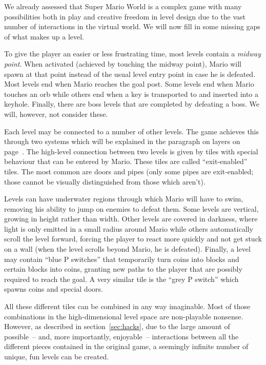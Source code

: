 We already assessed that Super Mario World is a complex game with many
possibilities both in play and creative freedom in level design due to
the vast number of interactions in the virtual world. We will now fill
in some missing gaps of what makes up a level.

To give the player an easier or less frustrating time, most levels
contain a \emph{midway point}. When activated (achieved by touching
the midway point), Mario will spawn at that point instead of the usual
level entry point in case he is defeated. Most levels end when Mario
reaches the goal post. Some levels end when Mario touches an orb while
others end when a key is transported to and inserted into a keyhole.
Finally, there are boss levels that are completed by defeating a boss.
We will, however, not consider these.

Each level may be connected to a number of other levels. The game
achieves this through two systems which will be explained in the
paragraph on layers on page~\pageref{par:layers}. The high-level
connection between two levels is given by tiles with special behaviour
that can be entered by Mario. These tiles are called ``exit-enabled''
tiles. The most common are doors and pipes (only some pipes are
exit-enabled; those cannot be visually distinguished from those which
aren't).

Levels can have underwater regions through which Mario will have to
swim, removing his ability to jump on enemies to defeat them. Some
levels are vertical, growing in height rather than width. Other levels
are covered in darkness, where light is only emitted in a small radius
around Mario while others automatically scroll the level forward,
forcing the player to react more quickly and not get stuck on a wall
(when the level scrolls beyond Mario, he is defeated). Finally, a
level may contain ``blue P switches'' that temporarily turn coins into
blocks and certain blocks into coins, granting new paths to the player
that are possibly required to reach the goal. A very similar tile is
the ``grey P switch'' which spawns coins and special doors.

All these different tiles can be combined in any way imaginable. Most
of those combinations in the high-dimensional level space are
non-playable nonsense. However, as described in
section~\ref{sec:hacks}, due to the large amount of possible~-- and,
more importantly, enjoyable~-- interactions between all the different
pieces contained in the original game, a seemingly infinite number of
unique, fun levels can be created.
\medskip

